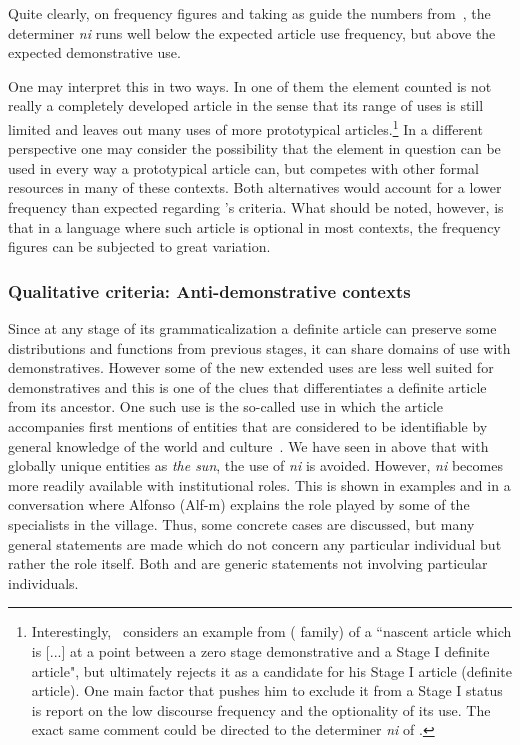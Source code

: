 \documentclass[output=paper
,modfonts
,nonflat]{langsci/langscibook}
\begin{document}
Quite clearly, on frequency figures and taking as guide the numbers from~\citet{Cyr1993}, the determiner \textit{ni} runs well below the expected article use frequency, but above the expected demonstrative use.

One may interpret this in two ways. In one of them the element counted is not really a completely developed article in the sense that its range of uses is still limited and leaves out many uses of more prototypical articles.\footnote{Interestingly,~\citet[62]{Greenberg1978howgender} considers an example from  ( family) of a ``nascent article which is [...] at a point between a zero stage demonstrative and a Stage I definite article", but ultimately rejects it as a candidate for his Stage I article (definite article). One main factor that pushes him to exclude it from a Stage I status is  report on the low discourse frequency and the optionality of its use. The exact same comment could be directed to the determiner \textit{ni} of .} In a different perspective one may consider the possibility that the element in question can be used in every way a prototypical article can, but competes with other formal resources in many of these contexts. Both alternatives would account for a lower frequency than expected regarding \citet{Cyr1993}'s criteria. What should be noted, however, is that in a language where such article is optional in most contexts, the frequency figures can be subjected to great variation.

\subsubsection{Qualitative criteria: Anti-demonstrative contexts}\label{sec:pico:4.1.2}

Since at any stage of its grammaticalization a definite article can preserve some distributions and functions from previous stages, it can share domains of use with demonstratives. However some of the new extended uses are less well suited for demonstratives and this is one of the clues that differentiates a definite article from its ancestor. 
One such use is the so-called  use in which the article accompanies first mentions of entities that are considered to be identifiable by general knowledge of the world and culture~\citep[][]{Himmelmann2001}. We have seen in  above that with globally unique entities as \textit{the sun}, the use of \textit{ni} is avoided. However, \textit{ni} becomes more readily available with institutional roles. This is shown in examples  and  in a conversation where Alfonso (Alf-m) explains the role played by some of the specialists in the village. Thus, some concrete cases are discussed, but many general statements are made which do not concern any particular individual but rather the role itself. Both  and  are generic statements not involving particular individuals. 
\end{document}
